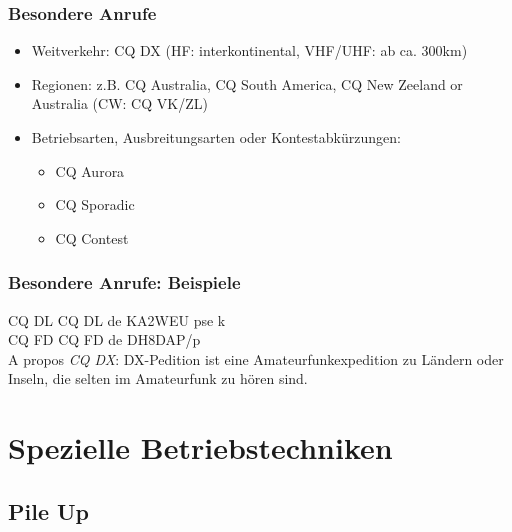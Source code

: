 \begin{frame}
    \frametitle{Besondere Anrufe}

    \begin{itemize}
        \item Weitverkehr: CQ DX (HF: interkontinental, VHF/UHF: ab ca. 300km)
        \item Regionen: z.B. CQ Australia, CQ South America, CQ New Zeeland or
              Australia (CW: CQ VK/ZL)
        \item Betriebsarten, Ausbreitungsarten oder Kontestabkürzungen:
        \begin{itemize}
            \item CQ Aurora
            \item CQ Sporadic
            \item CQ Contest
        \end{itemize}
    \end{itemize}
\end{frame}

\begin{frame}
    \frametitle{Besondere Anrufe: Beispiele}

    CQ DL CQ DL de KA2WEU pse k \\[2em]

    CQ FD CQ FD de DH8DAP/p \\[2em]

    A propos \emph{CQ DX}: DX-Pedition ist eine Amateurfunkexpedition zu Ländern
    oder Inseln, die selten im Amateurfunk zu hören sind.

\end{frame}

\section{Spezielle Betriebstechniken}

\subsection{Pile Up}

